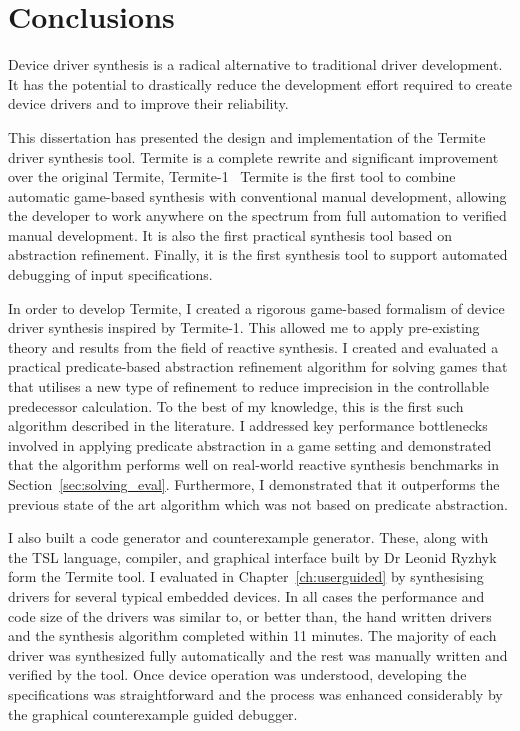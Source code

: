\chapter{Conclusions}

Device driver synthesis is a radical alternative to traditional driver development. It has the potential to drastically reduce the development effort required to create device drivers and to improve their reliability.

This dissertation has presented the design and implementation of the Termite driver synthesis tool. Termite is a complete rewrite and significant improvement over the original Termite, Termite-1~\cite{Ryzhyk_CKSH_09} Termite is the first tool to combine automatic game-based synthesis with conventional manual development, allowing the developer to work anywhere on the spectrum from full automation to verified manual development. It is also the first practical synthesis tool based on abstraction refinement. Finally, it is the first synthesis tool to support automated debugging of input specifications. 

In order to develop Termite, I created a rigorous game-based formalism of device driver synthesis inspired by Termite-1. This allowed me to apply pre-existing theory and results from the field of reactive synthesis. I created and evaluated a practical predicate-based abstraction refinement algorithm for solving games that that utilises a new type of refinement to reduce imprecision in the controllable predecessor calculation. To the best of my knowledge, this is the first such algorithm described in the literature. I addressed key performance bottlenecks involved in applying predicate abstraction in a game setting and demonstrated that the algorithm performs well on real-world reactive synthesis benchmarks in Section~\ref{sec:solving_eval}. Furthermore, I demonstrated that it outperforms the previous state of the art algorithm which was not based on predicate abstraction.

I also built a code generator and counterexample generator. These, along with the TSL language, compiler, and graphical interface built by Dr Leonid Ryzhyk form the Termite tool. I evaluated \termite in Chapter~\ref{ch:userguided} by synthesising drivers for several typical embedded devices. In all cases the performance and code size of the drivers was similar to, or better than, the hand written drivers and the synthesis algorithm completed within 11 minutes. The majority of each driver was synthesized fully automatically and the rest was manually written and verified by the tool. Once device operation was understood, developing the specifications was straightforward and the process was enhanced considerably by the graphical counterexample guided debugger.

